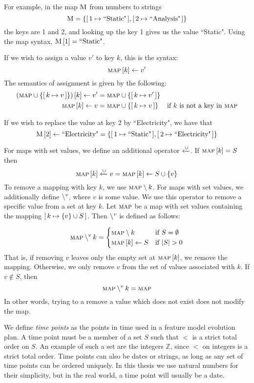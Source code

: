 For example, in the map $\textsc{M}$ from numbers to strings 
\[
  \textsc{M} = \{[ \,1 \mapsto \text{``Static"}\, ],\allowbreak [ \,2 \mapsto \text{``Analysis"}\, ]\}
\]
the keys are 1 and 2, and looking up the key 1 gives us the value ``Static". Using the map syntax, $\textsc{M} \left[ 1 \right] = \text{``Static"}$. 

If we wish to assign a value $v'$ to key $k$, this is the syntax:
\[
\textsc{map} \left[ k \right] \leftarrow v'
\]
The semantics of assignment is given by the following:
\begin{align*}
  \left(\textsc{map} \cup \left\{[ \,k \mapsto v\, ]\right\}\right) \left[ k \right] \leftarrow v' &= \textsc{map} \cup \left\{[ \,k \mapsto v'\, ]\right\} &&\\
  \textsc{map} \left[ k \right] \leftarrow v &= \textsc{map} \cup \left\{[ \,k \mapsto v\, ]\right\} && \text{if $k$ is not a key in \textsc{map}}
\end{align*}

If we wish to replace the value at key 2 by ``Electricity", we have that
\[
  \textsc{M} \left[ 2 \right] \leftarrow \text{``Electricity"} = \{[ \,1 \mapsto \text{``Static"}\, ],\allowbreak [ \,2 \mapsto \text{``Electricity"}\, ]\}
\]

For maps with set values, we define an additional operator $\xleftarrow{\cup}$. If $\textsc{map} \left[ k \right] = S$ then 
\[\textsc{map} \left[ k \right] \xleftarrow{\cup} v = \textsc{map} \left[ k \right] \leftarrow S \cup \{v\}\]
To remove a mapping with key $k$, we use $\textsc{map} \setminus k$. For maps with set values, we additionally define $\setminus^{v}$, where $v$ is some value. We use this operator to remove a specific value from a set at key $k$. Let $\textsc{map}$ be a map with set values containing the mapping $[ \,k \mapsto \{v\} \cup S\, ]$. Then $\setminus^{v}$ is defined as follows:

\[
  \textsc{map} \setminus^{v} k =
  \begin{cases}
    \textsc{map} \setminus k & \text{if } S = \emptyset\\
    \textsc{map} \left[ k \right] \leftarrow S & \text{if } |S| > 0
  \end{cases}
\]
That is, if removing $v$ leaves only the empty set at $\textsc{map} \left[ k \right]$, we remove the mapping. Otherwise, we only remove $v$ from the set of values associated with $k$. If $v \notin S$, then
\[
  \textsc{map} \setminus^{v} k = \textsc{map}
\]
In other words, trying to a remove a value which does not exist does not modify the map.

We define \emph{time points} as the points in time used in a feature model evolution plan. A time point must be a member of a set $S$ such that $<$ is a strict total order on $S$. An example of such a set are the integers $\mathbb{Z}$, since $<$ on integers is a strict total order. Time points can also be dates or strings, as long as any set of time points can be ordered uniquely. In this thesis we use natural numbers for their simplicity, but in the real world, a time point will usually be a date.

